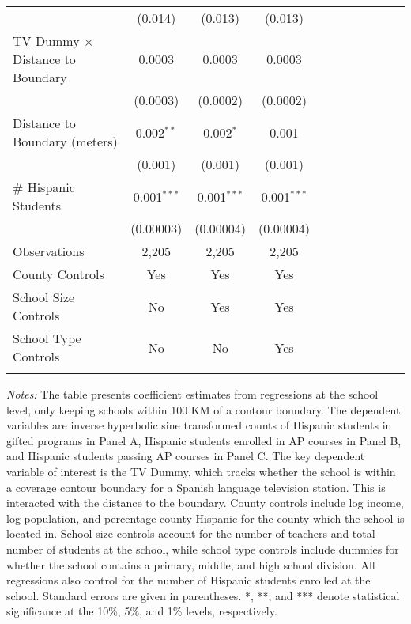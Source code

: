 \begin{table}[!h]
{\begin{threeparttable}
\begin{tabular}{lcccccccccc}
  & (0.014) & (0.013) & (0.013) \\ 
 TV Dummy $\times$ Distance to Boundary & 0.0003 & 0.0003 & 0.0003 \\ 
  & (0.0003) & (0.0002) & (0.0002) \\ 
 Distance to Boundary (meters) & 0.002$^{**}$ & 0.002$^{*}$ & 0.001 \\ 
  & (0.001) & (0.001) & (0.001) \\ 
 \# Hispanic Students & 0.001$^{***}$ & 0.001$^{***}$ & 0.001$^{***}$ \\ 
  & (0.00003) & (0.00004) & (0.00004) \\ 
Observations & 2,205 & 2,205 & 2,205 \\                 
\hline\hline\addlinespace
                                County Controls & Yes & Yes  & Yes\\
                                School Size Controls & No & Yes & Yes\\
                                School Type Controls & No & No & Yes \\
				\addlinespace\hline\hline
			\end{tabular}
			\begin{tablenotes}[flushleft]
				\item \textit{Notes:} The table presents coefficient estimates from regressions at the school level, only keeping schools within 100 KM of a contour boundary. The dependent variables are inverse hyperbolic sine transformed counts of Hispanic students in gifted programs in Panel A, Hispanic students enrolled in AP courses in Panel B, and Hispanic students passing AP courses in Panel C. The key dependent variable of interest is the TV Dummy, which tracks whether the school is within a coverage contour boundary for a Spanish language television station. This is interacted with the distance to the boundary. County controls include log income, log population, and percentage county Hispanic for the county which the school is located in. School size controls account for the number of teachers and total number of students at the school, while school type controls include dummies for whether the school contains a primary, middle, and high school division. All regressions also control for the number of Hispanic students enrolled at the school. Standard errors are given in parentheses. *, **, and *** denote statistical significance at the 10\%, 5\%, and 1\% levels, respectively.
			\end{tablenotes}
		\end{threeparttable}
	}
\end{table}